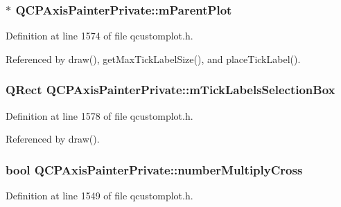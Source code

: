 \subsubsection[{m\+Parent\+Plot}]{$\ast$ Q\+C\+P\+Axis\+Painter\+Private\+::m\+Parent\+Plot\hspace{0.3cm}{\ttfamily [protected]}}\label{class_q_c_p_axis_painter_private_a882029a5f2d4abd71289d415c9b90a28}


Definition at line 1574 of file qcustomplot.\+h.



Referenced by draw(), get\+Max\+Tick\+Label\+Size(), and place\+Tick\+Label().

\hypertarget{class_q_c_p_axis_painter_private_a0adaf5f1d89be0f32dc4a904d157e5a9}{}
\subsubsection[{m\+Tick\+Labels\+Selection\+Box}]{\setlength{\rightskip}{0pt plus 5cm}Q\+Rect Q\+C\+P\+Axis\+Painter\+Private\+::m\+Tick\+Labels\+Selection\+Box\hspace{0.3cm}{\ttfamily [protected]}}\label{class_q_c_p_axis_painter_private_a0adaf5f1d89be0f32dc4a904d157e5a9}


Definition at line 1578 of file qcustomplot.\+h.



Referenced by draw().

\hypertarget{class_q_c_p_axis_painter_private_a0deb7524009140f00a774dfd286d002c}{}
\subsubsection[{number\+Multiply\+Cross}]{\setlength{\rightskip}{0pt plus 5cm}bool Q\+C\+P\+Axis\+Painter\+Private\+::number\+Multiply\+Cross}\label{class_q_c_p_axis_painter_private_a0deb7524009140f00a774dfd286d002c}


Definition at line 1549 of file qcustomplot.\+h.



